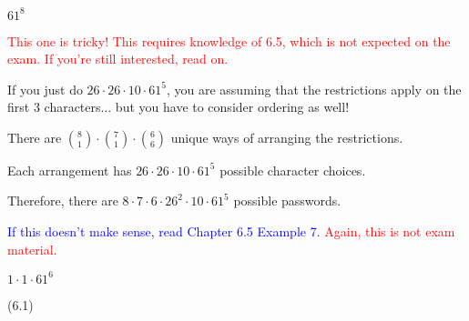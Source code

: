 \documentclass{exam}
\begin{document}
\begin{questions}
\begin{subparts}
\begin{center}
\end{center}


\begin{center}

\( 61^8 \)

\end{center}


\begin{center}

\textcolor{red}{This one is tricky! This requires knowledge of 6.5, which is not expected on the exam. If you're still interested, read on.}

If you just do \( 26 \cdot 26 \cdot 10 \cdot 61^5 \), you are assuming that the restrictions apply on the first 3 characters... but you have to consider ordering as well!

There are \({8 \choose 1} \cdot {7 \choose 1} \cdot {6 \choose 6}\) unique ways of arranging the restrictions. 

Each arrangement has \(26 \cdot 26 \cdot 10 \cdot 61^5\) possible character choices.

Therefore, there are \(8 \cdot 7 \cdot 6 \cdot 26^2 \cdot 10 \cdot 61^5\) possible passwords.

\textcolor{blue}{If this doesn't make sense, read Chapter 6.5 Example 7.}
\textcolor{red}{Again, this is not exam material.}

\end{center}


\begin{center}

\( 1 \cdot 1 \cdot 61^6 \)

\end{center}

\end{subparts}

 (6.1)

\begin{center}


\end{center}
\end{questions}
\end{document}
